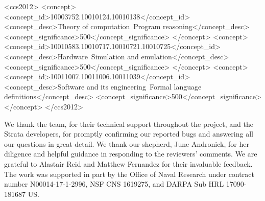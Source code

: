 \documentclass[sigplan,screen]{acmart}
\begin{document}
%
%
\begin{CCSXML}
<ccs2012>
<concept>
<concept_id>10003752.10010124.10010138</concept_id>
<concept_desc>Theory of computation~Program reasoning</concept_desc>
<concept_significance>500</concept_significance>
</concept>
<concept>
<concept_id>10010583.10010717.10010721.10010725</concept_id>
<concept_desc>Hardware~Simulation and emulation</concept_desc>
<concept_significance>500</concept_significance>
</concept>
<concept>
<concept_id>10011007.10011006.10011039</concept_id>
<concept_desc>Software and its engineering~Formal language definitions</concept_desc>
<concept_significance>500</concept_significance>
</concept>
</ccs2012>
\end{CCSXML}


%

%
\maketitle










%

%


\begin{acks}
We thank the \K team, for their technical support throughout the project, and
the Strata developers, for promptly confirming our reported bugs
and answering all our questions in great detail.  We thank our shepherd,
June Andronick, for her diligence and helpful guidance in responding to the
reviewers' comments. We are grateful to Alastair Reid and Matthew Fernandez
for their invaluable feedback.
The work was supported in part by
the Office of Naval Research under contract number N00014-17-1-2996,
NSF CNS 1619275,
and DARPA Sub HRL 17090-181687 US.
\end{acks}

%
\balance




%
\end{document}
